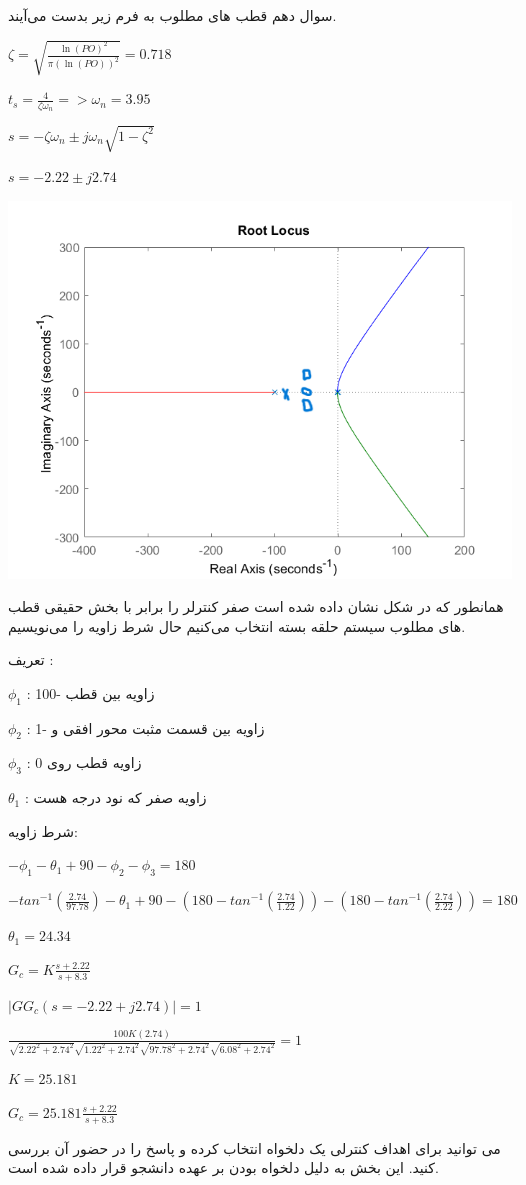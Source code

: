 \documentclass{article}
\begin{document}
\begin{problem}{سوال دهم}
	قطب های مطلوب به فرم زیر بدست می‌آیند.
	
	\raggedleft
	$\zeta = \sqrt{\frac{\ln(PO)^2}{\pi(\ln(PO))^2}} = 0.718$
	
	$t_s = \frac{4}{\zeta \omega_n} => \omega_n = 3.95  $
	
	$s = -\zeta\omega_n \pm j\omega_n\sqrt{1-\zeta^2}$
	
	$s = -2.22 \pm j2.74$
	
	\centering
	\includegraphics[scale=0.7]{Resources/5.png}
	
	\raggedright
	همانطور که در شکل نشان داده شده است صفر کنترلر را برابر با بخش حقیقی قطب های مطلوب سیستم حلقه بسته انتخاب می‌کنیم حال شرط زاویه را می‌نویسیم.
	
	تعریف :
	\raggedright
	
	$\phi_1$ : زاویه بین قطب -100 
	
	$\phi_2$ : زاویه بین قسمت مثبت محور افقی و -1
	
	$\phi_3$ : زاویه قطب روی 0
	
	$\theta_1$ : زاویه صفر که نود درجه هست
	
	شرط زاویه:
	
	\raggedleft
	$-\phi_1 - \theta_1 + 90 - \phi_2 - \phi_3 = 180$
	
	$-tan^{-1}(\frac{2.74}{97.78}) - \theta_1 + 90 - (180 - tan^{-1}(\frac{2.74}{1.22})) - (180 - tan^{-1}(\frac{2.74}{2.22})) = 180$
	
	$\theta_1 = 24.34$
	
	$G_c = K \frac{s+2.22}{s+8.3}$
	
	$|GG_c(s = -2.22+j2.74)| = 1$
	
	$\frac{100K(2.74)}{\sqrt{2.22^2+2.74^2} \sqrt{1.22^2+2.74^2} \sqrt{97.78^2 + 2.74^2} \sqrt{6.08^2 + 2.74^2}} = 1$
	
	$K = 25.181$
	
	$G_c = 25.181\frac{s+2.22}{s+8.3}$
	
	\raggedright
	می توانید برای اهداف کنترلی یک  دلخواه انتخاب کرده و پاسخ را در حضور آن بررسی کنید. این بخش به دلیل دلخواه بودن بر عهده دانشجو قرار داده شده است.
	
\end{problem}
\end{document}
